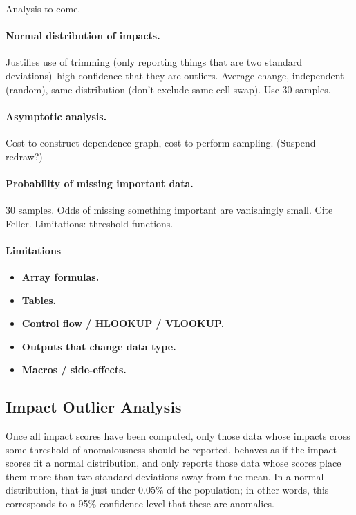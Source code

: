 Analysis to come.

\paragraph{Normal distribution of impacts.}

Justifies use of trimming (only reporting things that are two standard
deviations)--high confidence that they are outliers.  Average change,
independent (random), same distribution (don't exclude same cell
swap). Use 30 samples.

\paragraph{Asymptotic analysis.}

Cost to construct dependence graph, cost to perform sampling. (Suspend redraw?)

\paragraph{Probability of missing important data.}

30 samples. Odds of missing something important are vanishingly small.
Cite Feller. Limitations: threshold functions.

\paragraph{Limitations}

\begin{itemize}
\item {\bf Array formulas.}
\item {\bf Tables.}
\item {\bf Control flow / HLOOKUP / VLOOKUP.}
\item {\bf Outputs that change data type.}
\item {\bf Macros / side-effects.}
\end{itemize}

\subsection{Impact Outlier Analysis}

Once all impact scores have been computed, only those data whose
impacts cross some threshold of anomalousness should be
reported. \checkcell{} behaves as if the impact scores fit a normal
distribution, and only reports those data whose scores place them more
than two standard deviations away from the mean. In a normal
distribution, that is just under 0.05\% of the population; in other
words, this corresponds to a 95\% confidence level that these are
anomalies.

